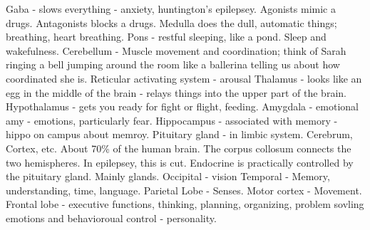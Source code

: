 \markdownRendererUlItem Gaba - slows everything - anxiety, huntington's epilepsey.\markdownRendererUlItemEnd 
\markdownRendererUlEndTight \markdownRendererUlItemEnd 
\markdownRendererUlItem Agonists mimic a drugs.\markdownRendererUlItemEnd 
\markdownRendererUlItem Antagonists blocks a drugs.\markdownRendererUlItemEnd 
\markdownRendererUlEnd \markdownRendererInterblockSeparator
{}\markdownRendererInterblockSeparator
{}\markdownRendererUlBeginTight
\markdownRendererUlItem Medulla does the dull, automatic things; breathing, heart breathing.\markdownRendererUlItemEnd 
\markdownRendererUlItem Pons - restful sleeping, like a pond. Sleep and wakefulness.\markdownRendererUlItemEnd 
\markdownRendererUlItem Cerebellum - Muscle movement and coordination; think of Sarah ringing a bell jumping around the room like a ballerina telling us about how coordinated she is.\markdownRendererUlItemEnd 
\markdownRendererUlItem Reticular activating system - arousal\markdownRendererUlItemEnd 
\markdownRendererUlItem Thalamus - looks like an egg in the middle of the brain - relays things into the upper part of the brain.\markdownRendererUlItemEnd 
\markdownRendererUlItem Hypothalamus - gets you ready for fight or flight, feeding.\markdownRendererUlItemEnd 
\markdownRendererUlItem Amygdala - emotional amy - emotions, particularly fear.\markdownRendererUlItemEnd 
\markdownRendererUlItem Hippocampus - associated with memory - hippo on campus about memroy.\markdownRendererUlItemEnd 
\markdownRendererUlItem Pituitary gland - in limbic system.\markdownRendererUlItemEnd 
\markdownRendererUlItem Cerebrum, Cortex, etc. About 70\% of the human brain.\markdownRendererUlItemEnd 
\markdownRendererUlItem The corpus collosum connects the two hemispheres. In epilepsey, this is cut.\markdownRendererUlItemEnd 
\markdownRendererUlItem Endocrine is practically controlled by the pituitary gland. Mainly glands.\markdownRendererUlItemEnd 
\markdownRendererUlEndTight \markdownRendererInterblockSeparator
{}\markdownRendererInterblockSeparator
{}\markdownRendererUlBegin
\markdownRendererUlItem Occipital - vision\markdownRendererUlItemEnd 
\markdownRendererUlItem Temporal - Memory, understanding, time, language.\markdownRendererUlItemEnd 
\markdownRendererUlItem Parietal Lobe - Senses.\markdownRendererUlItemEnd 
\markdownRendererUlItem Motor cortex - Movement.\markdownRendererUlItemEnd 
\markdownRendererUlItem Frontal lobe - executive functions, thinking, planning, organizing, problem sovling emotions and behavioroual control - personality.\markdownRendererUlItemEnd 

